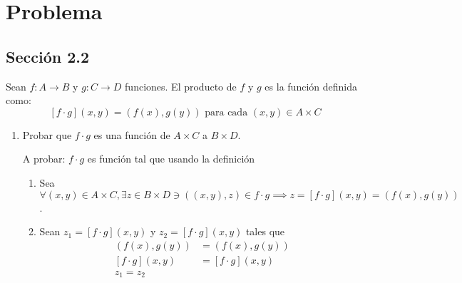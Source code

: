    





\section{Problema } 

\subsection{Sección 2.2}
\begin{problema}[Ejercicio 5]
	Sean $f: A \rightarrow B$ y $g: C \rightarrow D$ funciones. El producto de $f$ y $g$  es la función definida como: 
	$$
	[f \cdot g](x, y)=(f(x), g(y)) \text { para cada }(x, y) \in A \times C
	$$
	\begin{enumerate}
		\item Probar que $f \cdot g$ es una función de $A \times C$ a $B \times D$. 
		\begin{dem}
			A probar: $f\cdot g$ es función tal que usando la definición 
			\begin{enumerate}
				\item Sea $\forall (x,y)\in A\times C, \exists z\in B\times D\ni ((x,y),z)\in f\cdot g\implies z = 	[f \cdot g](x, y)=(f(x), g(y)) $.  
				\item Sean $z_1 = [f \cdot g](x, y)$ y $z_2= [f \cdot g](x, y)$ tales que 
				\begin{align*}
					(f(x), g(y)) &= (f(x), g(y)) \\
					[f \cdot g](x, y) &= [f \cdot g](x, y)\\
					z_1 = z_2
				\end{align*}
			\end{enumerate}
			

\end{dem}
\end{enumerate}
\end{problema}
